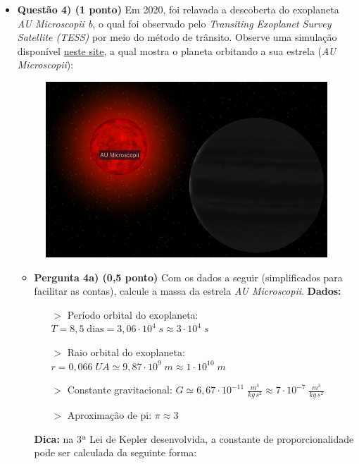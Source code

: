 \documentclass[a4paper, 12pt]{article}
\begin{document}
\begin{flushleft}
\begin{itemize}
		\item \textbf{Questão 4) (1 ponto)} Em 2020, foi relavada a descoberta do exoplaneta \textit{AU Microscopii b}, o qual foi observado pelo \textit{Transiting Exoplanet Survey Satellite (TESS)} por meio do método de trânsito. Observe uma simulação disponível \href{https://exoplanets.nasa.gov/exoplanet-catalog/7635/au-microscopii-b/}{neste site}, a qual mostra o planeta orbitando a sua estrela (\textit{AU Microscopii}):
			\begin{figure}[H]
				\centering
				\includegraphics[scale=0.5]{./img/4.png}
			\end{figure}
			\begin{itemize}
				\item \textbf{Pergunta 4a) (0,5 ponto)} Com os dados a seguir (simplificados para facilitar as contas), calcule a massa da estrela \textit{AU Microscopii}. \linebreak
					\textbf{Dados:}
						\begin{itemize}
							\item[$>$] Período orbital do exoplaneta: $T = 8,5 \; \textrm{dias} = 3,06 \cdot 10^4 \; s \approx 3 \cdot 10^4 \; s$
							\item[$>$] Raio orbital do exoplaneta: $r = 0,066 \; UA \simeq 9,87 \cdot 10^9 \; m \approx 1 \cdot 10^{10} \; m$
							\item[$>$] Constante gravitacional: $G \simeq 6,67 \cdot 10^{-11} \; \frac{m^3}{kg \, s^2} \approx 7 \cdot 10^{-7} \; \frac{m^3}{kg \, s^2}$
							\item[$>$] Aproximação de pi: $\pi \approx 3$
						\end{itemize}
					\textbf{Dica:} na 3ª Lei de Kepler desenvolvida, a constante de proporcionalidade pode ser calculada da seguinte forma:

\end{itemize}
\end{itemize}
\end{flushleft}
\end{document}
